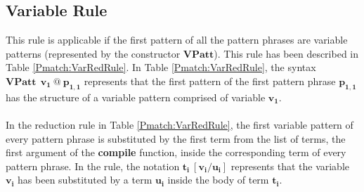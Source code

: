 \documentclass[11pt]{article}
\begin{document}
\subsection {Variable Rule}
This rule is applicable if the first pattern of all the pattern phrases are variable patterns (represented by the constructor $\mathbf{VPatt}$). This rule has been described in Table \ref {Pmatch:VarRedRule}. In Table \ref {Pmatch:VarRedRule}, 
the syntax $\mathbf{VPatt~~v_1~@~p_{1,1}}$ represents that the first pattern of the first pattern phrase $\mathbf{p_{1,1}}$ has the structure of a variable pattern comprised of variable $\mathbf{v_1}$.
~~\\~~\\
In the reduction rule in Table \ref {Pmatch:VarRedRule}, the first variable pattern of every pattern phrase is substituted by the first term from the list of terms, the first argument of the {\bf compile} function, inside the corresponding term of every pattern phrase. In the rule, the notation $\mathbf{t_i~{[v_i/u_i]}}$ represents that the variable $\mathbf{v_i}$ has been substituted by a term $\mathbf{u_i}$ inside the body of term $\mathbf{t_i}$.
\end{document}
